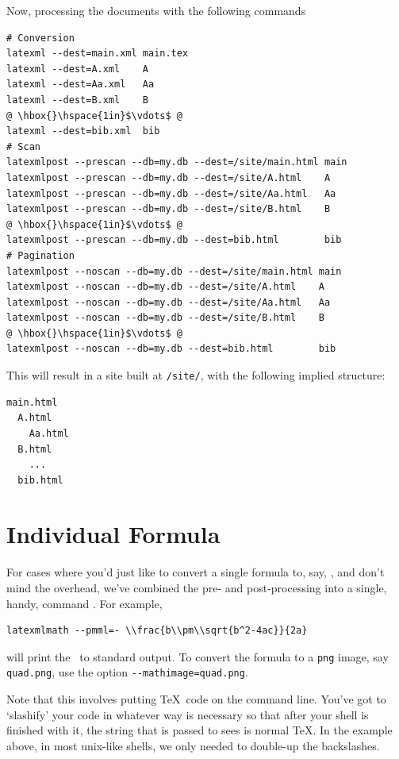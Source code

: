 \documentclass{book}
\newcommand{\shellcode}{\lstinline[style=shell]}
\begin{document}
Now, processing the documents with  the following commands
\begin{lstlisting}[style=shell]
# Conversion
latexml --dest=main.xml main.tex
latexml --dest=A.xml    A
latexml --dest=Aa.xml   Aa
latexml --dest=B.xml    B
@ \hbox{}\hspace{1in}$\vdots$ @
latexml --dest=bib.xml  bib
# Scan
latexmlpost --prescan --db=my.db --dest=/site/main.html main
latexmlpost --prescan --db=my.db --dest=/site/A.html    A
latexmlpost --prescan --db=my.db --dest=/site/Aa.html   Aa
latexmlpost --prescan --db=my.db --dest=/site/B.html    B
@ \hbox{}\hspace{1in}$\vdots$ @
latexmlpost --prescan --db=my.db --dest=bib.html        bib
# Pagination
latexmlpost --noscan --db=my.db --dest=/site/main.html main
latexmlpost --noscan --db=my.db --dest=/site/A.html    A
latexmlpost --noscan --db=my.db --dest=/site/Aa.html   Aa
latexmlpost --noscan --db=my.db --dest=/site/B.html    B
@ \hbox{}\hspace{1in}$\vdots$ @
latexmlpost --noscan --db=my.db --dest=bib.html        bib
\end{lstlisting}
This will result in a site built at \verb|/site/|, with the following implied structure:
\begin{verbatim}
main.html
  A.html
    Aa.html
  B.html
    ...
  bib.html
\end{verbatim}
\section{Individual Formula}\label{usage.latexmlmath}
For cases where you'd just like to convert a single formula to, say, \MathML,
and don't mind the overhead, we've combined the pre- and post-processing into
a single, handy, command .  For example,
\begin{lstlisting}[style=shell]
  latexmlmath --pmml=- \\frac{b\\pm\\sqrt{b^2-4ac}}{2a}
\end{lstlisting}
will print the \MathML\ to standard output.  
To convert the formula to a \texttt{png} image, say \texttt{quad.png},
use the option \shellcode{--mathimage=quad.png}.

Note that this involves putting \TeX\ code on the command line.
You've got to `slashify' your code in whatever way is necessary
so that after your shell is finished with it, the string that
is passed to  sees is normal \TeX.  In the
example above, in most unix-like shells, we only needed to
double-up the backslashes.
\end{document}
